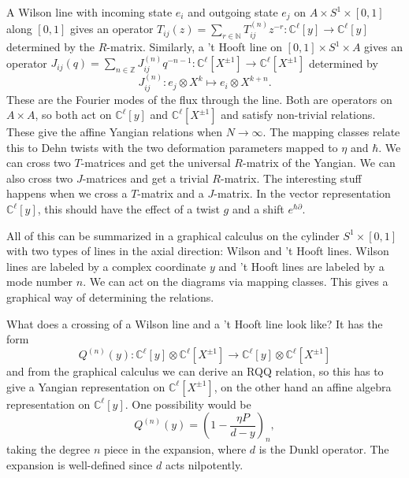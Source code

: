 \documentclass[11pt]{report}
\theoremstyle{definition}
\theoremstyle{remark}
\theoremstyle{remark}
\newcommand{\N}{\mathbb{N}}
\newcommand{\Z}{\mathbb{Z}}
\newcommand{\C}{\mathbb{C}}
\begin{document}
A Wilson line with incoming state $e_i$ and outgoing state $e_j$ on $A \times S^1 \times [0,1]$ along $[0,1]$ gives an operator $T_{ij}(z) = \sum_{r \in \N} T_{ij}^{(n)} z^{-r}: \C^\ell[y] \to \C^\ell[y]$ determined by the $R$-matrix. Similarly, a 't Hooft line on $[0,1] \times S^1 \times A$ gives an operator $J_{ij}(q) = \sum_{n \in \Z} J_{ij}^{(n)} q^{-n-1}: \C^\ell[X^{\pm 1}] \to \C^\ell[X^{\pm 1}]$ determined by
\begin{equation*}
J_{ij}^{(n)}: e_j \otimes X^k \mapsto e_i \otimes X^{k+n}.
\end{equation*}
These are the Fourier modes of the flux through the line. Both are operators on $A \times A$, so both act on $\C^\ell[y]$ and $\C^\ell[X^{\pm 1}]$ and satisfy non-trivial relations. These give the affine Yangian relations when $N \to \infty$. The mapping classes relate this to Dehn twists with the two deformation parameters mapped to $\eta$ and $\hbar$. We can cross two $T$-matrices and get the universal $R$-matrix of the Yangian. We can also cross two $J$-matrices and get a trivial $R$-matrix. The interesting stuff happens when we cross a $T$-matrix and a $J$-matrix. In the vector representation $\C^\ell[y]$, this should have the effect of a twist $g$ and a shift $e^{\hbar \partial}$.

All of this can be summarized in a graphical calculus on the cylinder $S^1 \times [0,1]$ with two types of lines in the axial direction: Wilson and 't Hooft lines. Wilson lines are labeled by a complex coordinate $y$ and 't Hooft lines are labeled by a mode number $n$. We can act on the diagrams via mapping classes. This gives a graphical way of determining the relations.

What does a crossing of a Wilson line and a 't Hooft line look like? It has the form
\begin{equation*}
Q^{(n)}(y): \C^\ell[y] \otimes \C^\ell[X^{\pm 1}] \to \C^\ell[y] \otimes \C^\ell[X^{\pm 1}]
\end{equation*}
and from the graphical calculus we can derive an RQQ relation, so this has to give a Yangian representation on $\C^\ell[X^{\pm 1}]$, on the other hand an affine algebra representation on $\C^\ell[y]$. One possibility would be
\begin{equation*}
Q^{(n)}(y) = (1 - \frac{\eta P}{d-y})_n,
\end{equation*}
taking the degree $n$ piece in the expansion, where $d$ is the Dunkl operator. The expansion is well-defined since $d$ acts nilpotently.
\end{document}
